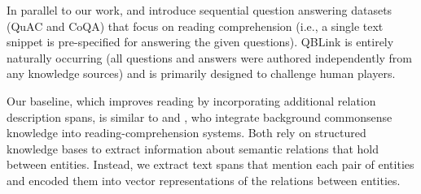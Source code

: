 In parallel to our work,  and
 introduce sequential question answering
datasets (QuAC and CoQA) that focus on reading comprehension 
(i.e., a single text snippet is pre-specified for answering the given
questions).
QBLink is entirely naturally occurring (all questions and answers were
authored independently from any knowledge sources) and is primarily designed to
challenge human players. 

 


Our baseline, which improves reading by incorporating additional
relation description spans, is similar to
 and
, who integrate background
commonsense knowledge into reading-comprehension systems.  Both rely
on structured knowledge bases to extract information about semantic
relations that hold between entities. Instead, we extract text spans
that mention each pair of entities and encoded them into vector
representations of the relations between entities.
